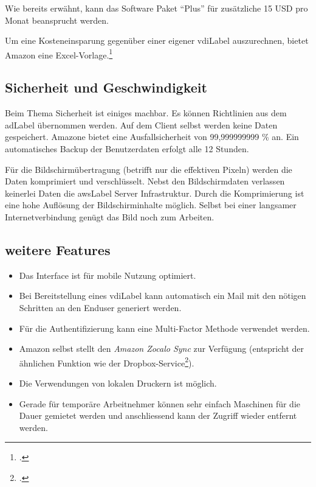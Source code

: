 Wie bereits erwähnt, kann das Software Paket "`Plus"' für zusätzliche 15 USD pro Monat beansprucht werden.

Um eine Kosteneinsparung gegenüber einer eigener \Gls{vdiLabel} auszurechnen, bietet Amazon eine Excel-Vorlage.\footcite{TCO_Comparison_Amazon_WorkSpaces_and_Traditional_Virtual_Desktop_Infrastructure_VDI_2014-11-15}

\subsection{Sicherheit und Geschwindigkeit}
Beim Thema Sicherheit ist einiges machbar.
Es können Richtlinien aus dem \Gls{adLabel} übernommen werden.
Auf dem Client selbst werden keine Daten gespeichert.
Amazone bietet eine Ausfallsicherheit von 99,999999999 \% an.
Ein automatisches Backup der Benutzerdaten erfolgt alle 12 Stunden.

Für die Bildschirmübertragung (betrifft nur die effektiven Pixeln) werden die Daten komprimiert und verschlüsselt.
Nebst den Bildschirmdaten verlassen keinerlei Daten die \Gls{awsLabel} Server Infrastruktur.
Durch die Komprimierung ist eine hohe Auflösung der Bildschirminhalte möglich. Selbst bei einer langsamer Internetverbindung genügt das Bild noch zum Arbeiten.

\subsection{weitere Features}
\begin{itemize}
	\item Das Interface ist für mobile Nutzung optimiert.
	\item Bei Bereitstellung eines \Gls{vdiLabel} kann automatisch ein Mail mit den nötigen Schritten an den Enduser generiert werden.
	\item Für die Authentifizierung kann eine Multi-Factor Methode verwendet werden.
	\item Amazon selbst stellt den \textit{Amazon Zocalo Sync} zur Verfügung (entspricht der ähnlichen Funktion wie der Dropbox-Service\footcite{Dropbox_2014-11-15}).
	\item Die Verwendungen von lokalen Druckern ist möglich.
	\item Gerade für temporäre Arbeitnehmer können sehr einfach Maschinen für die Dauer gemietet werden und anschliessend kann der Zugriff wieder entfernt werden.
\end{itemize}



